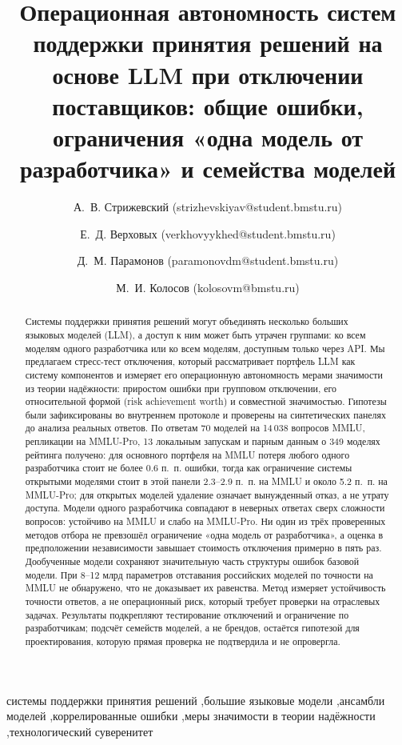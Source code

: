 \documentclass[preprint,12pt,authoryear]{elsarticle}
\begin{document}
\begin{frontmatter}

\title{Операционная автономность систем поддержки принятия решений на основе LLM при отключении поставщиков: общие ошибки, ограничения «одна модель от разработчика» и семейства моделей}

\author{А.~В. Стрижевский (strizhevskiyav@student.bmstu.ru)}
\author{Е.~Д. Верховых (verkhovyykhed@student.bmstu.ru)}
\author{Д.~М. Парамонов (paramonovdm@student.bmstu.ru)}
\author{М.~И. Колосов (kolosovm@bmstu.ru)}
\address{МГТУ им. Н.~Э. Баумана, Москва, Россия}

\begin{abstract}
Системы поддержки принятия решений могут объединять несколько больших языковых моделей (LLM), а доступ к ним может быть утрачен группами: ко всем моделям одного разработчика или ко всем моделям, доступным только через API. Мы предлагаем стресс-тест отключения, который рассматривает портфель LLM как систему компонентов и измеряет его операционную автономность мерами значимости из теории надёжности: приростом ошибки при групповом отключении, его относительной формой (risk achievement worth) и совместной значимостью. Гипотезы были зафиксированы во внутреннем протоколе и проверены на синтетических панелях до анализа реальных ответов. По ответам 70 моделей на 14\,038 вопросов MMLU, репликации на MMLU-Pro, 13 локальным запускам и парным данным о 349 моделях рейтинга получено: для основного портфеля на MMLU потеря любого одного разработчика стоит не более 0.6 п.~п. ошибки, тогда как ограничение системы открытыми моделями стоит в этой панели 2.3--2.9 п.~п. на MMLU и около 5.2 п.~п. на MMLU-Pro; для открытых моделей удаление означает вынужденный отказ, а не утрату доступа. Модели одного разработчика совпадают в неверных ответах сверх сложности вопросов: устойчиво на MMLU и слабо на MMLU-Pro. Ни один из трёх проверенных методов отбора не превзошёл ограничение «одна модель от разработчика», а оценка в предположении независимости завышает стоимость отключения примерно в пять раз. Дообученные модели сохраняют значительную часть структуры ошибок базовой модели. При 8--12 млрд параметров отставания российских моделей по точности на MMLU не обнаружено, что не доказывает их равенства. Метод измеряет устойчивость точности ответов, а не операционный риск, который требует проверки на отраслевых задачах. Результаты подкрепляют тестирование отключений и ограничение по разработчикам; подсчёт семейств моделей, а не брендов, остаётся гипотезой для проектирования, которую прямая проверка не подтвердила и не опровергла.
\end{abstract}

\begin{keyword}
системы поддержки принятия решений \sep большие языковые модели \sep ансамбли моделей \sep коррелированные ошибки \sep меры значимости в теории надёжности \sep технологический суверенитет
\end{keyword}

\end{frontmatter}
\end{document}
